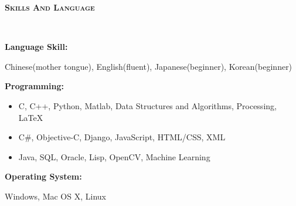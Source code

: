 \documentclass[paper=a4]{article}
\newenvironment{changemargin}[2]{%
  \begin{list}{}{%
    \setlength{\topsep}{0pt}%
    \setlength{\leftmargin}{#1}%
    \setlength{\rightmargin}{#2}%
    \setlength{\listparindent}{\parindent}%
    \setlength{\itemindent}{\parindent}%
    \setlength{\parsep}{\parskip}%
  }%
  \item[]}{\end{list}
}
\newcommand{\lineover}{
	\begin{changemargin}{-0.05in}{-0.05in}
		\vspace*{-8pt}
		\hrulefill \\
		\vspace*{-2pt}
	\end{changemargin}
}
\newcommand{\header}[1]{
	\begin{changemargin}{-0.5in}{-0.5in}
		\bfseries{\scshape{#1}}\\
  	\lineover
	\end{changemargin}
}
\newenvironment{body} {
	\vspace*{-16pt}
	\begin{changemargin}{-0.5in}{-0.5in}
  }	
	{\end{changemargin}
}
\begin{document}
\smallskip

\header{\large{Skills And Language}}
\begin{body}
	\vspace{15pt}
	{\textbf{Language Skill:}}
		\begin{changemargin}{1.4in}{-0.05in}\vspace{-12pt}
		Chinese(mother tongue), English(fluent), Japanese(beginner), Korean(beginner)
	\end{changemargin}
	\smallskip
	{\textbf{Programming:}}\vspace{5pt}
	\begin{changemargin}{1.9in}{-0.05in}\vspace{-14pt}
		\begin{itemize} \itemsep -0pt  %
	  		\item[\FiveStar \FiveStar \FiveStar \FiveStar \FiveStar] {C, C++, Python, Matlab, Data Structures and Algorithms, Processing, \LaTeX}
			\item[\FiveStar \FiveStar \FiveStar \FiveStar \FiveStarOpen] {C\#, Objective-C, Django, JavaScript, HTML/CSS, XML}
			\item[\FiveStar \FiveStar \FiveStar \FiveStarOpen \FiveStarOpen] { Java, SQL, Oracle, Lisp, OpenCV, Machine Learning}
		\end{itemize}
	\end{changemargin}
	\smallskip
	\smallskip
	{\textbf{Operating System:}}
	\begin{changemargin}{1.4in}{-0.05in}\vspace{-13pt}
		Windows, Mac OS X, Linux
	\end{changemargin}

\end{body}
\end{document}
